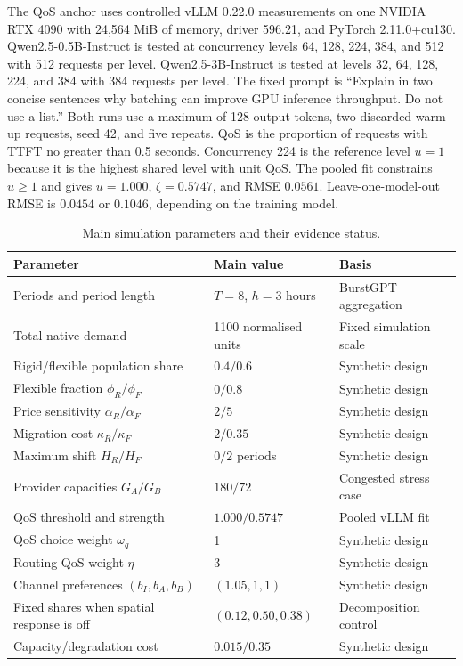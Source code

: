 \documentclass[11pt,a4paper]{article}
\begin{document}
The QoS anchor uses controlled vLLM 0.22.0 measurements on one NVIDIA RTX 4090 with 24,564 MiB of memory, driver 596.21, and PyTorch 2.11.0+cu130. Qwen2.5-0.5B-Instruct is tested at concurrency levels 64, 128, 224, 384, and 512 with 512 requests per level. Qwen2.5-3B-Instruct is tested at levels 32, 64, 128, 224, and 384 with 384 requests per level. The fixed prompt is ``Explain in two concise sentences why batching can improve GPU inference throughput. Do not use a list.'' Both runs use a maximum of 128 output tokens, two discarded warm-up requests, seed 42, and five repeats. QoS is the proportion of requests with TTFT no greater than 0.5 seconds. Concurrency 224 is the reference level $u=1$ because it is the highest shared level with unit QoS. The pooled fit constrains $\bar u\ge1$ and gives $\bar u=1.000$, $\zeta=0.5747$, and RMSE $0.0561$. Leave-one-model-out RMSE is $0.0454$ or $0.1046$, depending on the training model.

\begin{table}[H]
\centering
\caption{Main simulation parameters and their evidence status.}
\label{tab:parameters}
\small
\begin{tabular}{@{}lll@{}}
\toprule
Parameter & Main value & Basis \\
\midrule
Periods and period length & $T=8$, $h=3$ hours & BurstGPT aggregation \\
Total native demand & 1100 normalised units & Fixed simulation scale \\
Rigid/flexible population share & $0.4/0.6$ & Synthetic design \\
Flexible fraction $\phi_R/\phi_F$ & $0/0.8$ & Synthetic design \\
Price sensitivity $\alpha_R/\alpha_F$ & $2/5$ & Synthetic design \\
Migration cost $\kappa_R/\kappa_F$ & $2/0.35$ & Synthetic design \\
Maximum shift $H_R/H_F$ & $0/2$ periods & Synthetic design \\
Provider capacities $G_A/G_B$ & $180/72$ & Congested stress case \\
QoS threshold and strength & $1.000/0.5747$ & Pooled vLLM fit \\
QoS choice weight $\omega_q$ & 1 & Synthetic design \\
Routing QoS weight $\eta$ & 3 & Synthetic design \\
Channel preferences $(b_I,b_A,b_B)$ & $(1.05,1,1)$ & Synthetic design \\
Fixed shares when spatial response is off & $(0.12,0.50,0.38)$ & Decomposition control \\
Capacity/degradation cost & $0.015/0.35$ & Synthetic design \\
\bottomrule
\end{tabular}
\end{table}
\end{document}
